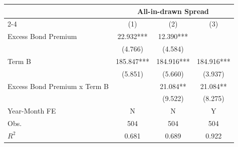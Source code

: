 {
\def\sym#1{\ifmmode^{#1}\else\(^{#1}\)\fi}
\begin{tabular}{l*{3}{c}}
\toprule\toprule
                              &\multicolumn{3}{c}{All-in-drawn Spread}        \\\cmidrule(lr){2-4}
                              &\multicolumn{1}{c}{(1)}   &\multicolumn{1}{c}{(2)}   &\multicolumn{1}{c}{(3)}   \\
\toprule
Excess Bond Premium           &      22.932***&      12.390***&               \\
                              &     (4.766)   &     (4.584)   &               \\
[1em]
Term B                        &     185.847***&     184.916***&     184.916***\\
                              &     (5.851)   &     (5.660)   &     (3.937)   \\
[1em]
Excess Bond Premium x Term B  &               &      21.084** &      21.084** \\
                              &               &     (9.522)   &     (8.275)   \\
\toprule
Year-Month FE                 &           N   &           N   &           Y   \\
Obs.                          &         504   &         504   &         504   \\
$R^2$                         &       0.681   &       0.689   &       0.922   \\
\toprule\toprule
\end{tabular}
}
